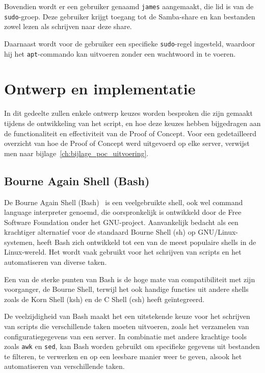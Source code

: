 Bovendien wordt er een gebruiker genaamd \texttt{james} aangemaakt, die lid is van de \texttt{sudo}-groep.
Deze gebruiker krijgt toegang tot de Samba-share en kan bestanden zowel lezen als schrijven naar deze share.

Daarnaast wordt voor de gebruiker een specifieke \texttt{sudo}-regel ingesteld, waardoor hij het \texttt{apt}-commando kan uitvoeren zonder een wachtwoord in te voeren.

\section{Ontwerp en implementatie}
\label{poc_ontwerp_implementatie}

In dit gedeelte zullen enkele ontwerp keuzes worden besproken die zijn gemaakt tijdens de ontwikkeling van het script, en hoe deze keuzes hebben bijgedragen aan de functionaliteit en effectiviteit van de Proof of Concept.
Voor een gedetailleerd overzicht van hoe de Proof of Concept werd uitgevoerd op elke server, verwijst men naar bijlage~\ref{ch:bijlage_poc_uitvoering}.

\subsection{Bourne Again Shell (Bash)}
\label{poc_bash}

De Bourne Again Shell (Bash)~\autocite{gnu-bash-home} is een veelgebruikte shell, ook wel command language interpreter genoemd, die oorspronkelijk is ontwikkeld door de Free Software Foundation onder het GNU-project.
Aanvankelijk bedacht als een krachtiger alternatief voor de standaard Bourne Shell (sh) op GNU/Linux-systemen, heeft Bash zich ontwikkeld tot een van de meest populaire shells in de Linux-wereld.
Het wordt vaak gebruikt voor het schrijven van scripts en het automatiseren van diverse taken.

Een van de sterke punten van Bash is de hoge mate van compatibiliteit met zijn voorganger, de Bourne Shell, terwijl het ook handige functies uit andere shells zoals de Korn Shell (ksh) en de C Shell (csh) heeft ge\"integreerd.

De veelzijdigheid van Bash maakt het een uitstekende keuze voor het schrijven van scripts die verschillende taken moeten uitvoeren, zoals het verzamelen van configuratiegegevens van een server.
In combinatie met andere krachtige tools zoals \texttt{awk} en \texttt{sed}, kan Bash worden gebruikt om specifieke gegevens uit bestanden te filteren, te verwerken en op een leesbare manier weer te geven, alsook het automatiseren van verschillende taken.

